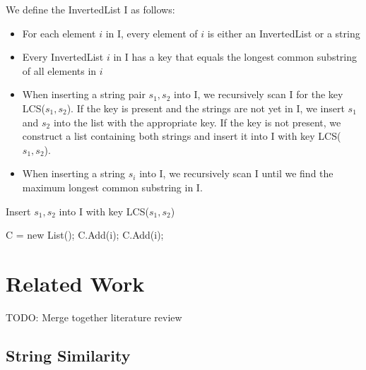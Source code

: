 \documentclass[pdftex,12pt,letter]{article}
\begin{document}
We define the InvertedList I as follows:

\begin{itemize}
\item For each element $i$ in I, every element of $i$ is either an InvertedList or a string
\item Every InvertedList $i$ in I has a key that equals the longest common substring of all elements in $i$
\item When inserting a string pair $s_1, s_2$ into I, we recursively scan I for the key LCS($s_1, s_2$). If the key is present and the strings are not yet in I, we insert $s_1$ and $s_2 $ into the list with the appropriate key. If the key is not present, we construct a list containing both strings and insert it into I with key LCS($s_1, s_2$).
\item When inserting a string $s_i$ into I, we recursively scan I until we find the maximum longest common substring in I. 
\end{itemize}

\begin{algorithm}
\caption{Insert $s_1, s_2$ into I with key LCS($s_1, s_2$)}
\label{Algorithm 2}
\begin{algorithmic}[1]
\STATE C = new List();
\STATE C.Add(i);
\ENDIF
\ENDFOR
{}
\STATE C.Add(i);
\ENDIF
\ENDFOR
\ENDFOR
\end{algorithmic}
\end{algorithm}

\section{Related Work}
TODO: Merge together literature review

\subsection{String Similarity}
\end{document}
